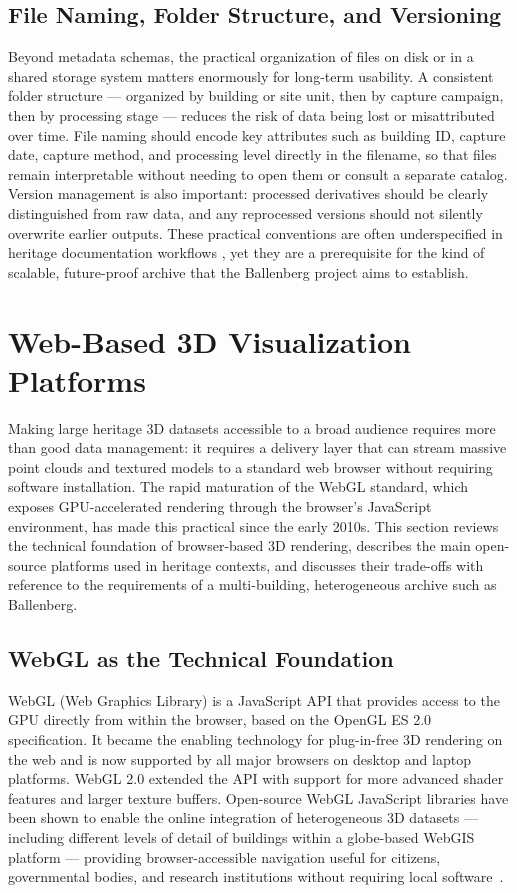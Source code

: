 \documentclass[]{report}
\begin{document}
\subsection{File Naming, Folder Structure, and Versioning}

Beyond metadata schemas, the practical organization of files on disk or in a shared storage
system matters enormously for long-term usability. A consistent folder structure --- organized
by building or site unit, then by capture campaign, then by processing stage --- reduces the
risk of data being lost or misattributed over time. File naming should encode key attributes
such as building ID, capture date, capture method, and processing level directly in the
filename, so that files remain interpretable without needing to open them or consult a separate
catalog. Version management is also important: processed derivatives should be clearly
distinguished from raw data, and any reprocessed versions should not silently overwrite earlier
outputs. These practical conventions are often underspecified in heritage documentation
workflows \cite{liu2025tls}, yet they are a prerequisite for the kind of scalable,
future-proof archive that the Ballenberg project aims to establish.


\section{Web-Based 3D Visualization Platforms}
\label{sec:visualization}

Making large heritage 3D datasets accessible to a broad audience requires more than good data
management: it requires a delivery layer that can stream massive point clouds and textured models
to a standard web browser without requiring software installation. The rapid maturation of the
WebGL standard, which exposes GPU-accelerated rendering through the browser's JavaScript
environment, has made this practical since the early 2010s. This section reviews the technical
foundation of browser-based 3D rendering, describes the main open-source platforms used in
heritage contexts, and discusses their trade-offs with reference to the requirements of a
multi-building, heterogeneous archive such as Ballenberg.

\subsection{WebGL as the Technical Foundation}

WebGL (Web Graphics Library) is a JavaScript API that provides access to the GPU directly from
within the browser, based on the OpenGL ES 2.0 specification. It became the enabling technology
for plug-in-free 3D rendering on the web and is now supported by all major browsers on desktop
and laptop platforms. WebGL 2.0 extended the API with support for more advanced shader features
and larger texture buffers. Open-source WebGL JavaScript libraries have been shown to enable the online integration of heterogeneous 3D datasets
--- including different levels of detail of buildings within a globe-based WebGIS platform ---
providing browser-accessible navigation useful for citizens, governmental bodies, and research
institutions without requiring local software~\cite{laguardia2022webgl}.
\end{document}
